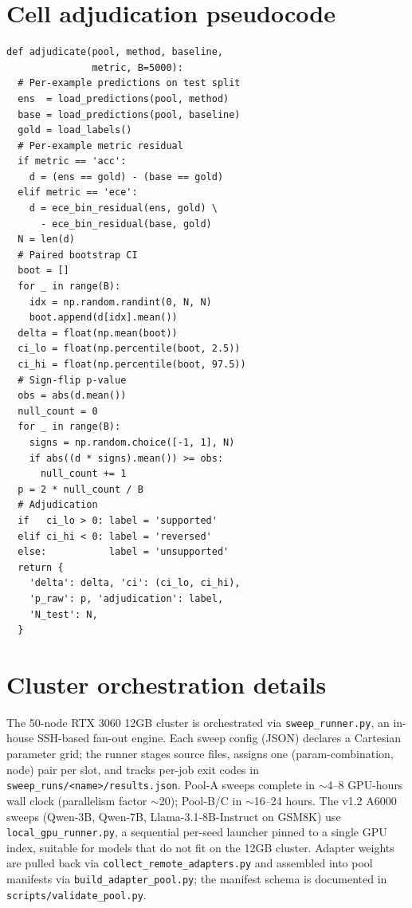 \documentclass[11pt]{article}
\begin{document}
\section{Cell adjudication pseudocode}\label{app:pseudocode}
{\scriptsize\begin{verbatim}
def adjudicate(pool, method, baseline,
               metric, B=5000):
  # Per-example predictions on test split
  ens  = load_predictions(pool, method)
  base = load_predictions(pool, baseline)
  gold = load_labels()
  # Per-example metric residual
  if metric == 'acc':
    d = (ens == gold) - (base == gold)
  elif metric == 'ece':
    d = ece_bin_residual(ens, gold) \
      - ece_bin_residual(base, gold)
  N = len(d)
  # Paired bootstrap CI
  boot = []
  for _ in range(B):
    idx = np.random.randint(0, N, N)
    boot.append(d[idx].mean())
  delta = float(np.mean(boot))
  ci_lo = float(np.percentile(boot, 2.5))
  ci_hi = float(np.percentile(boot, 97.5))
  # Sign-flip p-value
  obs = abs(d.mean())
  null_count = 0
  for _ in range(B):
    signs = np.random.choice([-1, 1], N)
    if abs((d * signs).mean()) >= obs:
      null_count += 1
  p = 2 * null_count / B
  # Adjudication
  if   ci_lo > 0: label = 'supported'
  elif ci_hi < 0: label = 'reversed'
  else:           label = 'unsupported'
  return {
    'delta': delta, 'ci': (ci_lo, ci_hi),
    'p_raw': p, 'adjudication': label,
    'N_test': N,
  }
\end{verbatim}}

\section{Cluster orchestration details}\label{app:cluster}
The 50-node RTX 3060 12GB cluster is orchestrated via \texttt{sweep\_runner.py}, an in-house SSH-based fan-out engine. Each sweep config (JSON) declares a Cartesian parameter grid; the runner stages source files, assigns one (param-combination, node) pair per slot, and tracks per-job exit codes in \texttt{sweep\_\allowbreak runs/\allowbreak <name>/\allowbreak results.\allowbreak json}. Pool-A sweeps complete in $\sim$4--8 GPU-hours wall clock (parallelism factor $\sim$20); Pool-B/C in $\sim$16--24 hours. The v1.2 A6000 sweeps (Qwen-3B, Qwen-7B, Llama-3.1-8B-Instruct on GSM8K) use \texttt{local\_\allowbreak gpu\_\allowbreak runner.\allowbreak py}, a sequential per-seed launcher pinned to a single GPU index, suitable for models that do not fit on the 12GB cluster. Adapter weights are pulled back via \texttt{collect\_\allowbreak remote\_\allowbreak adapters.\allowbreak py} and assembled into pool manifests via \texttt{build\_\allowbreak adapter\_\allowbreak pool.\allowbreak py}; the manifest schema is documented in \texttt{scripts/\allowbreak validate\_\allowbreak pool.\allowbreak py}.
\end{document}

